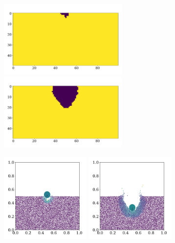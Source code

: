 \documentclass{article}
\begin{document}
    \begin{figure}[H]
        \centering
        \begin{subfigure}{.4\textwidth}                    
            \includegraphics[width=0.7\textwidth]{../plots/problem4/crater0.pdf}
            \includegraphics[width=0.7\textwidth]{../plots/problem4/crater19.pdf}
        \end{subfigure}
        \begin{subfigure}{.59\textwidth}                    
            \includegraphics[width=0.49\textwidth]{../plots/problem4/particles0.pdf}
            \includegraphics[width=0.49\textwidth]{../plots/problem4/particles19.pdf}

\end{subfigure}
\end{figure}
\end{document}
